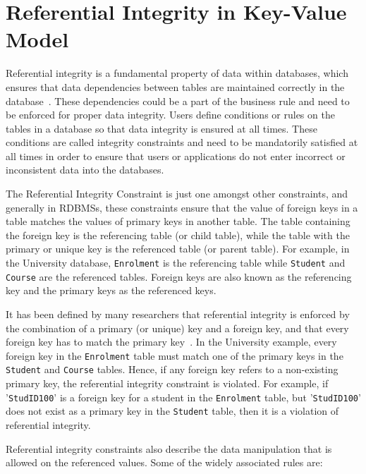\section{Referential Integrity in Key-Value
Model}\label{s:referential-integrity} 

Referential integrity is a fundamental property of data within databases,  
which ensures that data dependencies between tables are maintained correctly in
the database~\citep{blaha,date,Navathe,george}.  These dependencies
could be a part of the business rule and need to be enforced for proper data integrity.  Users define
conditions or rules on the tables in a database so that data integrity is
ensured at all times.  These conditions are called integrity constraints and
need to be mandatorily satisfied at all times in order to ensure that users or
applications do not enter incorrect or inconsistent data into the databases.

The Referential Integrity Constraint is just one amongst other constraints,  
and generally in \acp{RDBMS},   these constraints ensure that the value of
foreign keys in a table matches the values of primary keys in another table. 
The table containing the foreign key is the referencing table (or child table),
while the table with the primary or unique key is the referenced table (or
parent table).
For example,   in the University database,   \texttt{Enrolment} is the
referencing table while \texttt{Student} and \texttt{Course} are the referenced
tables.  Foreign keys are also known as the referencing key and
the primary keys as the referenced keys. 

It has been defined by many researchers that referential integrity is enforced
by the combination of a primary (or unique) key and a foreign key,   and that
every foreign key has to match the primary
key~\citep{blaha,Navathe,george,pathivada}.
In the University example,   every foreign key in the \texttt{Enrolment} table must
match one of the primary keys in the \texttt{Student} and \texttt{Course}
tables.
Hence,   if any foreign key refers to a non-existing primary key,   the
referential integrity constraint is violated.   For example,   if
'\texttt{StudID100}' is a foreign key for a student in the \texttt{Enrolment}
table,   but '\texttt{StudID100}' does not exist as a primary key in the
\texttt{Student} table,   then it is a violation of referential integrity.
 
Referential integrity constraints also describe the data manipulation that is
allowed on the referenced values.  Some of the widely associated rules are:

